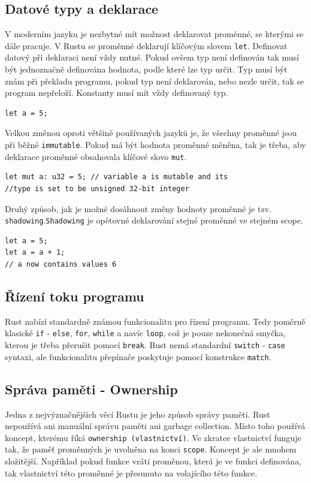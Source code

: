 \documentclass[12pt, letterpaper]{article}
\begin{document}
\subsection{Datové typy a deklarace}
V moderním jazyku je nezbytné mít možnost deklarovat proměnné, se kterými se dále pracuje. V Rustu se
proměnné deklarují klíčovým slovem \texttt{let}. Definovat datový při deklaraci není vždy nutné. Pokud
ovšem typ není definován tak musí být jednoznačně definována hodnota, podle které lze typ určit. Typ musí
být znám při překladu programu, pokud typ není deklarován, nebo nezle určit, tak se program nepřeloží.
Konstanty musí mít vždy definovaný typ.
%
\begin{lstlisting}[caption=Deklarace int proměnné]
let a = 5;
\end{lstlisting}
%

Velkou změnou oproti většině používaných jazyků je, že všechny proměnné jsou při běžné 
\texttt{immutable}. Pokud má být hodnota proměnné měněna, tak je třeba, aby deklarace proměnné obsahovala
klíčové slovo \texttt{mut}.
%
\begin{lstlisting}[caption=Deklarace mutable proměné]
let mut a: u32 = 5; // variable a is mutable and its
//type is set to be unsigned 32-bit integer
\end{lstlisting}
%

Druhý způsob, jak je možné dosáhnout změny hodnoty proměnné je tzv. \texttt{shadowing}.\texttt{Shadowing} je
opětovné deklarování stejné proměnné ve stejném scope.
%
\begin{lstlisting}[caption=Příklad shadowingu]
let a = 5;
let a = a + 1;
// a now contains values 6
\end{lstlisting}
%
\subsection{Řízení toku programu}
Rust nabízí standardně známou funkcionalitu pro řízení programu. Tedy poměrně klasické \texttt{if} - 
\texttt{else}, \texttt{for}, \texttt{while} a navíc \texttt{loop}, což je pouze nekonečná smyčka, kterou je
třeba přerušit pomocí \texttt{break}. Rust nemá standardní \texttt{switch} - \texttt{case} syntaxi, ale 
funkcionalitu přepínače poskytuje pomocí konstrukce \texttt{match}.
%
\subsection{Správa paměti - Ownership}
Jedna z nejvýznačnějších věcí Rustu je jeho způsob správy paměti. Rust nepoužívá ani manuální správu paměti
ani garbage collection. Místo toho používá koncept, kterému říká \texttt{ownership (vlastnictví)}. Ve 
zkratce vlastnictví funguje tak, že paměť proměnných je uvolněna na konci \texttt{scope}. Koncept je ale
mnohem složitější. Například pokud funkce vrátí proměnou, která je ve funkci definována, tak vlastnictví 
této proměnné je přesunuto na volajícího této funkce.
\end{document}
